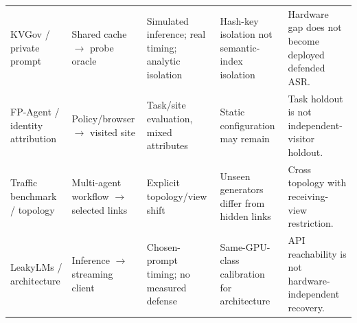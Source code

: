 \begin{table}[t]
\begin{tabularx}{\textwidth}{@{}p{}p{}p{}YY@{}}
KVGov / private prompt & Shared cache $\to$ probe oracle & Simulated inference; real timing; analytic isolation & Hash-key isolation not semantic-index isolation & Hardware gap does not become deployed defended ASR.\\
FP-Agent / identity attribution & Policy/browser $\to$ visited site & Task/site evaluation, mixed attributes & Static configuration may remain & Task holdout is not independent-visitor holdout.\\
Traffic benchmark / topology & Multi-agent workflow $\to$ selected links & Explicit topology/view shift & Unseen generators differ from hidden links & Cross topology with receiving-view restriction.\\
LeakyLMs / architecture & Inference $\to$ streaming client & Chosen-prompt timing; no measured defense & Same-GPU-class calibration for architecture & API reachability is not hardware-independent recovery.\\\bottomrule
\end{tabularx}\end{table}
